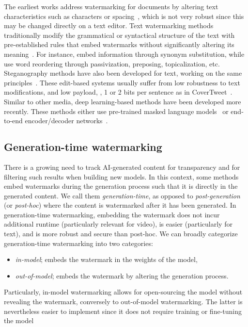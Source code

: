 The earliest works address watermarking for documents by altering text characteristics such as characters or spacing~\citep{brassil1995electronic}, which is not very robust since this may be changed directly on a text editor.
Text watermarking methods traditionally modify the grammatical or syntactical structure of the text with pre-established rules that embed watermarks without significantly altering its meaning~\citep{topkara2005natural}.
For instance, \cite{topkara2006hiding} embed information through synonym substitution, while~\cite{topkara2006words, topkara2006natural, meral2009natural} use word reordering through passivization, preposing, topicalization, etc.
Steganography methods have also been developed for text, working on the same principles~\citep{winstein1998lexical, chapman2001practical, bolshakov2004method, shirali2008new, chang2014practical, xiang2017novel}.
These edit-based systems usually suffer from low robustness to text modifications, and low payload, \eg, 1 or 2 bits per sentence as in CoverTweet~\citep{wilson2016avoiding}.
Similar to other media, deep learning-based methods have been developed more recently.
These methods either use pre-trained masked language models~\citep{ueoka2021frustratingly} or end-to-end encoder/decoder networks~\citep{abdelnabi2021adversarial}.


\subsection{Generation-time watermarking}\label{chap0/sec:generation-watermarking}

There is a growing need to track AI-generated content for transparency and for filtering such results when building new models.
In this context, some methods embed watermarks during the generation process such that it is directly in the generated content.
We call them \emph{generation-time}, as opposed to \emph{post-generation} (or \emph{post-hoc}) where the content is watermarked after it has been generated.
In generation-time watermarking, embedding the watermark does not incur additional runtime (particularly relevant for video), is easier (particularly for text), and is more robust and secure than post-hoc. 
We can broadly categorize generation-time watermarking into two categories:
\begin{itemize}[noitemsep]
    \item \emph{in-model}; embeds the watermark in the weights of the model,
    \item \emph{out-of-model}; embeds the watermark by altering the generation process.
\end{itemize}
Particularly, in-model watermarking allows for open-sourcing the model without revealing the watermark, conversely to out-of-model watermarking.
The latter is nevertheless easier to implement since it does not require training or fine-tuning the model

